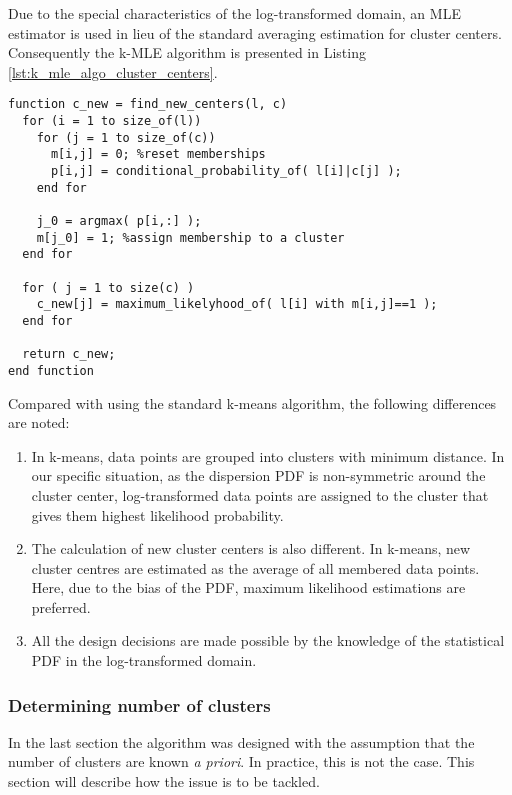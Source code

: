 Due to the special characteristics of the log-transformed domain, 
an MLE estimator is used in lieu of the standard averaging estimation for cluster centers. 
Consequently the k-MLE algorithm is presented in Listing \ref{lst:k_mle_algo_cluster_centers}.

\lstset{language=Matlab,caption=Iteratively find better cluster centers,label=lst:k_mle_algo_cluster_centers}
\begin{lstlisting}[frame=tb]
function c_new = find_new_centers(l, c)
  for (i = 1 to size_of(l))
    for (j = 1 to size_of(c))
      m[i,j] = 0; %reset memberships
      p[i,j] = conditional_probability_of( l[i]|c[j] );
    end for
   
    j_0 = argmax( p[i,:] );
    m[j_0] = 1; %assign membership to a cluster
  end for

  for ( j = 1 to size(c) )
    c_new[j] = maximum_likelyhood_of( l[i] with m[i,j]==1 );
  end for

  return c_new;
end function
\end{lstlisting}

Compared with using the standard k-means algorithm, the following differences are noted:
\begin{enumerate}
  \item In k-means, data points are grouped into clusters with minimum distance. 
In our specific situation, as the dispersion PDF is non-symmetric around the cluster center, log-transformed data points are assigned to the cluster that gives them highest likelihood probability.
  \item The calculation of new cluster centers is also different. 
In k-means, new cluster centres are estimated as the average of all membered data points. 
Here, due to the bias of the PDF, maximum likelihood estimations are preferred.
  \item All the design decisions are made possible by the knowledge of the statistical PDF in the log-transformed domain.
\end{enumerate}

\subsubsection{Determining number of clusters}

In the last section the algorithm was designed with the assumption that the number of clusters are known \textit{a priori}. 
In practice, this is not the case. This section will describe how the issue is to be tackled.

